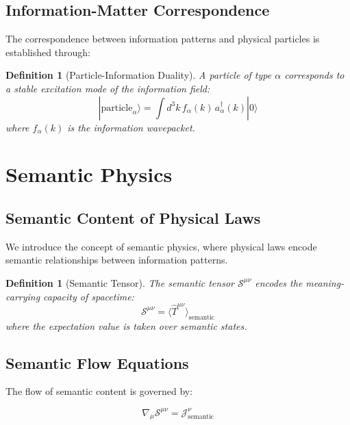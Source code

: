 \documentclass[11pt,a4paper]{article}
\newtheorem{definition}[theorem]{Definition}
\begin{document}
\subsection{Information-Matter Correspondence}

The correspondence between information patterns and physical particles is established through:

\begin{definition}[Particle-Information Duality]
A particle of type $\alpha$ corresponds to a stable excitation mode of the information field:
\begin{equation}
|\text{particle}_{\alpha}\rangle = \int d^3k \, f_{\alpha}(k) \, a^{\dagger}_{\alpha}(k) |0\rangle
\end{equation}
where $f_{\alpha}(k)$ is the information wavepacket.
\end{definition}

\section{Semantic Physics}

\subsection{Semantic Content of Physical Laws}

We introduce the concept of semantic physics, where physical laws encode semantic relationships between information patterns.

\begin{definition}[Semantic Tensor]
The semantic tensor $\mathcal{S}^{\mu\nu}$ encodes the meaning-carrying capacity of spacetime:
\begin{equation}
\mathcal{S}^{\mu\nu} = \langle \hat{T}^{\mu\nu} \rangle_{\text{semantic}}
\end{equation}
where the expectation value is taken over semantic states.
\end{definition}

\subsection{Semantic Flow Equations}

The flow of semantic content is governed by:

\begin{equation}
\nabla_{\mu} \mathcal{S}^{\mu\nu} = \mathcal{J}^{\nu}_{\text{semantic}}
\end{equation}
\end{document}
